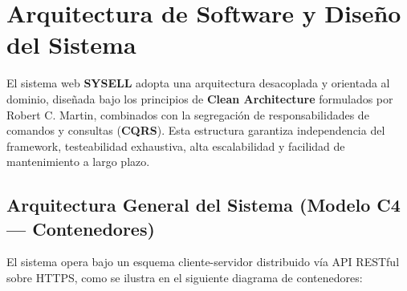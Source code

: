 
\section{Arquitectura de Software y Diseño del Sistema}

El sistema web \textbf{SYSELL} adopta una arquitectura desacoplada y orientada al dominio, diseñada bajo los principios de \textbf{Clean Architecture} formulados por Robert C. Martin, combinados con la segregación de responsabilidades de comandos y consultas (\textbf{CQRS}). Esta estructura garantiza independencia del framework, testeabilidad exhaustiva, alta escalabilidad y facilidad de mantenimiento a largo plazo.

\subsection{Arquitectura General del Sistema (Modelo C4 --- Contenedores)}

El sistema opera bajo un esquema cliente-servidor distribuido vía API RESTful sobre HTTPS, como se ilustra en el siguiente diagrama de contenedores:

